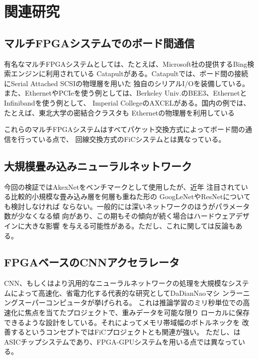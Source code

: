 \chapter{関連研究}
\section{マルチFPGAシステムでのボード間通信}
有名なマルチFPGAシステムとしては、たとえば、Microsoft社の提供するBing検索エンジンに利用されている
Catapult\cite{Catapult}がある。Catapultでは、ボード間の接続にSerial Attached SCSIの物理層を用いた
独自のシリアルI/Oを装備している。
また、EthernetやPCIeを使う例としては、Berkeley Univ.のBEE3\cite{BEE3}、EthernetとInfinibandを使う例として、
Imperial CollegeのAXCEL\cite{Axcel}がある。国内の例では、たとえば、東北大学の密結合クラスタ\cite{Sano}も
Ethernetの物理層を利用している

これらのマルチFPGAシステムはすべてパケット交換方式によってボード間の通信を行っている点で、
回線交換方式のFiCシステムとは異なっている。

\section{大規模畳み込みニューラルネットワーク}
今回の検証ではAkexNet\cite{alexnet}をベンチマークとして使用したが、近年
注目されている比較的小規模な畳み込み層を何層も重ねた形の
GoogLeNet\cite{googlenet}やResNet\cite{resnet}についても検討しなければ
ならない。一般的には深いネットワークのほうがパラメータ数が少なくなる傾
向があり、この期もその傾向が続く場合はハードウェアデザインに大きな影響
を与える可能性がある。ただし、これに関しては反論\cite{dodeepnet}もある。

\section{FPGAベースのCNNアクセラレータ}
CNN、もしくはより汎用的なニューラルネットワークの処理を大規模なシステ
ムによって高速化、省電力化する代表的な研究としてDaDianNaoマシ
ンラーニングスーパーコンピュータ\cite{dadiannao}が挙げられる。
これは推論学習のミリ秒単位での高速化に焦点を当てたプロジェクトで、重みデータを可能な限り
ローカルに保存できるような設計をしている。それによってメモリ帯域幅のボトルネックを
改善するというコンセプトではFiCプロジェクトとも関連が強い。
ただし、\cite{dadiannao}はASICチップシステムであり、FPGA-GPUシステムを用いる点では異なっている。



